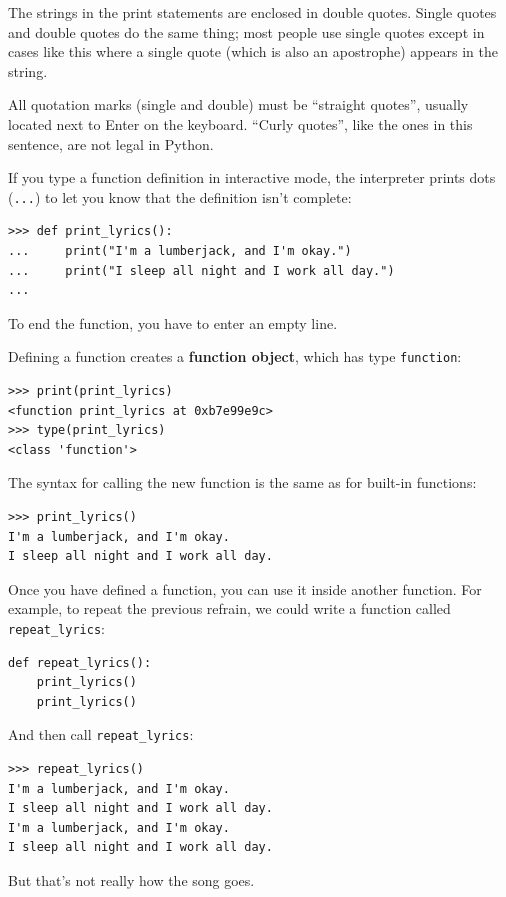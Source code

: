\documentclass[10pt]{book}
\begin{document}
The strings in the print statements are enclosed in double
quotes.  Single quotes and double quotes do the same thing;
most people use single quotes except in cases like this where
a single quote (which is also an apostrophe) appears in the string.

All quotation marks (single and double)
must be ``straight quotes'', usually
located next to Enter on the keyboard.  ``Curly quotes'', like
the ones in this sentence, are not legal in Python.

If you type a function definition in interactive mode, the interpreter
prints dots ({\tt ...}) to let you know that the definition
isn't complete:

\begin{verbatim}
>>> def print_lyrics():
...     print("I'm a lumberjack, and I'm okay.")
...     print("I sleep all night and I work all day.")
...
\end{verbatim}
%
To end the function, you have to enter an empty line.

Defining a function creates a {\bf function object}, which
has type \verb"function":

\begin{verbatim}
>>> print(print_lyrics)
<function print_lyrics at 0xb7e99e9c>
>>> type(print_lyrics)
<class 'function'>
\end{verbatim}
%
The syntax for calling the new function is the same as
for built-in functions:

\begin{verbatim}
>>> print_lyrics()
I'm a lumberjack, and I'm okay.
I sleep all night and I work all day.
\end{verbatim}
%
Once you have defined a function, you can use it inside another
function.  For example, to repeat the previous refrain, we could write
a function called \verb"repeat_lyrics":

\begin{verbatim}
def repeat_lyrics():
    print_lyrics()
    print_lyrics()
\end{verbatim}
%
And then call \verb"repeat_lyrics":

\begin{verbatim}
>>> repeat_lyrics()
I'm a lumberjack, and I'm okay.
I sleep all night and I work all day.
I'm a lumberjack, and I'm okay.
I sleep all night and I work all day.
\end{verbatim}
%
But that's not really how the song goes.
\end{document}

